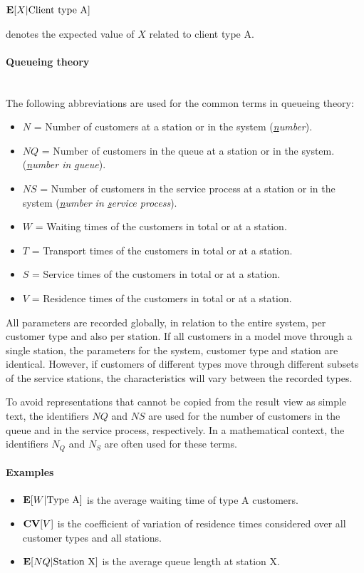 \documentclass{svmono}
\begin{document}
${\bf E}[X|\textrm{Client type A}]$

denotes the expected value of $X$ related to client type A.

\paragraph{Queueing theory}~\\
The following abbreviations are used for the common terms in queueing theory:
\begin{itemize}
\item
$N$ = Number of customers at a station or in the system (\textit{\underline{n}umber}).
\item
$NQ$ = Number of customers in the queue at a station or in the system. (\textit{\underline{n}umber in \underline{q}ueue}).
\item
$NS$ = Number of customers in the service process at a station or in the system (\textit{\underline{n}umber in \underline{s}ervice process}).
\item
$W$ = Waiting times of the customers in total or at a station.
\item
$T$ = Transport times of the customers in total or at a station.
\item
$S$ = Service times of the customers in total or at a station.
\item
$V$ = Residence times of the customers in total or at a station.
\end{itemize}

All parameters are recorded globally, in relation to the entire system, per customer type and also per station. If all customers in a model move through a single station, the parameters for the system, customer type and station are identical. However, if customers of different types move through different subsets of the service stations, the characteristics will vary between the recorded types.

To avoid representations that cannot be copied from the result view as simple text, the identifiers $NQ$ and $NS$ are used for the number of customers in the queue and in the service process, respectively. In a mathematical context, the identifiers $N_Q$ and $N_S$ are often used for these terms.

\paragraph{Examples}
\begin{itemize}
\item
${\bf E}[W|\textrm{Type A}]$
is the average waiting time of type A customers.
\item
${\bf CV}[V]$
is the coefficient of variation of residence times considered over all customer types and all stations.
\item
${\bf E}[NQ|\textrm{Station X}]$
is the average queue length at station X.
\end{itemize}
\end{document}
